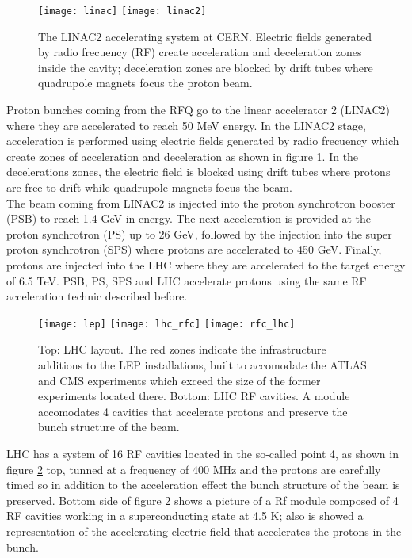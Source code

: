 \begin{figure}[!h]
  \centering
  \texttt{[image: linac]}
  \texttt{[image: linac2]}
  \caption [The LINAC2 accelerating system at CERN.]{The LINAC2 accelerating system at CERN. Electric fields generated by radio frecuency (RF) create acceleration and deceleration zones inside the cavity; deceleration zones are blocked by drift tubes where quadrupole magnets focus the proton beam.\cite{linac}}\label{fig:linac}
\end{figure}

\noindent Proton bunches coming from the RFQ go to the linear accelerator 2 (LINAC2) where they are accelerated to reach 50 MeV energy. In the LINAC2 stage, acceleration is performed using electric fields generated by radio frecuency which create zones of acceleration and deceleration as shown in figure \ref{fig:linac}. In the decelerations zones, the electric field is blocked using drift tubes where protons are free to drift while quadrupole magnets focus the beam.\\   

\noindent The beam coming from LINAC2 is injected into the proton synchrotron booster (PSB) to reach 1.4 GeV in energy. The next acceleration is provided at the proton synchrotron (PS) up to 26 GeV, followed by the injection into the super proton synchrotron (SPS) where protons are accelerated to 450 GeV. Finally, protons are injected into the LHC where they are accelerated to the target energy of 6.5 TeV.
\noindent PSB, PS, SPS and LHC accelerate protons using the same RF acceleration technic described before. 

\begin{figure}[!h]
\centering
\texttt{[image: lep]}
\texttt{[image: lhc\_rfc]}
\texttt{[image: rfc\_lhc]}
\caption[LHC layout and RF cavities module.]{Top: LHC layout. The red zones indicate the infrastructure additions to the LEP installations, built to accomodate the ATLAS and CMS experiments which exceed the size of the former experiments located there\cite{lep}. Bottom: LHC RF cavities. A module accomodates 4 cavities that accelerate protons and preserve the bunch structure of the beam.\cite{video,lhc_rfc}}\label{fig:lep_rfc}
\end{figure}

\noindent LHC has a system of 16 RF cavities located in the so-called point 4, as shown in figure \ref{fig:lep_rfc} top, tunned at a frequency of 400 MHz and the protons are carefully timed so in addition to the acceleration effect the bunch structure of the beam is preserved. Bottom side of figure \ref{fig:lep_rfc} shows a picture of a Rf module composed of 4 RF cavities working in a superconducting state at 4.5 K; also is showed a representation of the accelerating electric field that accelerates the protons in the bunch.\\ 


